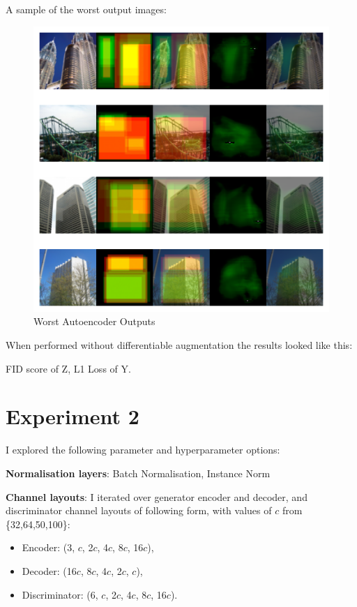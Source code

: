 \documentclass{UoYCSproject}
\begin{document}
A sample of the worst output images:

\begin{figure}[h]
    \centering
    \includegraphics[width=\linewidth]{Worst autoencoder Outputs}
    \caption{Worst Autoencoder Outputs}
    \label{fig:autoencoderWorstOutput}
\end{figure}

When performed without differentiable augmentation the results looked like this:

FID score of Z, L1 Loss of Y.

\section{Experiment 2}

I explored the following parameter and hyperparameter options:

\textbf{Normalisation layers}: Batch Normalisation, Instance Norm

\textbf{Channel layouts}:
I iterated over generator encoder and decoder, and discriminator channel layouts of following form, with values of $c$ from \{32,64,50,100\}:
\begin{itemize}
\item Encoder: (3, $c$, 2$c$, 4$c$, 8$c$, 16$c$), 
\item Decoder: (16$c$, 8$c$, 4$c$, 2$c$, $c$),
\item Discriminator: (6, $c$, 2$c$, 4$c$, 8$c$, 16$c$).
\end{itemize}
\end{document}
